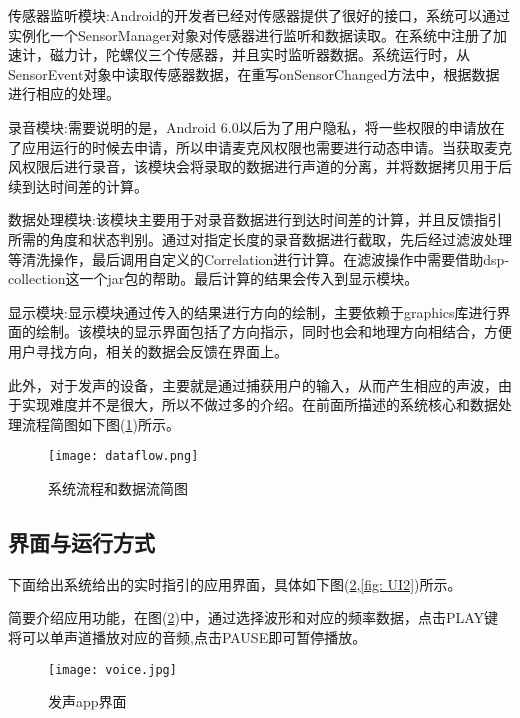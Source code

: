 \documentclass[winfonts]{njuthesis}
\begin{document}
			传感器监听模块:Android的开发者已经对传感器提供了很好的接口，系统可以通过实例化一个SensorManager对象对传感器进行监听和数据读取。在系统中注册了加速计，磁力计，陀螺仪三个传感器，并且实时监听器数据。系统运行时，从SensorEvent对象中读取传感器数据，在重写onSensorChanged方法中，根据数据进行相应的处理。
			
			录音模块:需要说明的是，Android 6.0以后为了用户隐私，将一些权限的申请放在了应用运行的时候去申请，所以申请麦克风权限也需要进行动态申请。当获取麦克风权限后进行录音，该模块会将录取的数据进行声道的分离，并将数据拷贝用于后续到达时间差的计算。
			
			数据处理模块:该模块主要用于对录音数据进行到达时间差的计算，并且反馈指引所需的角度和状态判别。通过对指定长度的录音数据进行截取，先后经过滤波处理等清洗操作，最后调用自定义的Correlation进行计算。在滤波操作中需要借助dsp-collection这一个jar包的帮助。最后计算的结果会传入到显示模块。
			
			显示模块:显示模块通过传入的结果进行方向的绘制，主要依赖于graphics库进行界面的绘制。该模块的显示界面包括了方向指示，同时也会和地理方向相结合，方便用户寻找方向，相关的数据会反馈在界面上。
			
			此外，对于发声的设备，主要就是通过捕获用户的输入，从而产生相应的声波，由于实现难度并不是很大，所以不做过多的介绍。在前面所描述的系统核心和数据处理流程简图如下图(\ref{fig: dataflow})所示。
			
			\begin{figure}[H]
				\centering
				\texttt{[image: dataflow.png]} 
				\caption{{系统流程和数据流简图}}
				\label{fig: dataflow}
			\end{figure}
			
		\subsection{界面与运行方式}
		
			下面给出系统给出的实时指引的应用界面，具体如下图(\ref{fig: UI1},\ref{fig: UI2})所示。
			
			简要介绍应用功能，在图(\ref{fig: UI1})中，通过选择波形和对应的频率数据，点击PLAY键将可以单声道播放对应的音频,点击PAUSE即可暂停播放。
			
			\begin{figure}[H]
				\centering
				\texttt{[image: voice.jpg]}
				\caption{发声app界面}
				\label{fig: UI1}
			\end{figure}
		
\end{document}
